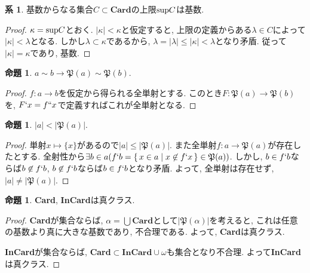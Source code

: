 \documentclass[a4paper, twoside]{bxjsarticle}
\newcommand{\abs}[1]{\left\lvert#1\right\rvert}
\theoremstyle{definition}
\newtheorem{prop}[thm]{命題}
\newtheorem{cor}[thm]{系}
\begin{document}
        \begin{cor}\label{supcardiscard}
            基数からなる集合$C\subset \textbf{Card}$の上限${\rm sup}C$は基数.
        \end{cor}
        \begin{proof}
            $\kappa = {\rm sup}C$とおく. $\abs{\kappa}<\kappa$と仮定すると, 上限の定義からある$\lambda\in C$によって$\abs{\kappa}<\lambda$となる. しかし$\lambda\subset\kappa$であるから, $\lambda=\abs{\lambda}\leq\abs{\kappa}<\lambda$となり矛盾. 従って$\abs{\kappa}=\kappa$であり, 基数.
        \end{proof}
        \begin{prop}
            $a\sim b\to \mathfrak{P}(a)\sim\mathfrak{P}(b)$.
        \end{prop}
        \begin{proof}
            $f\colon a\to b$を仮定から得られる全単射とする. このとき$F\colon \mathfrak{P}(a)\to\mathfrak{P}(b)$を, $F`x=f``x$で定義すればこれが全単射となる.
        \end{proof}
        \begin{prop}
            $\abs{a}<\abs{\mathfrak{P}(a)}$.
        \end{prop}
        \begin{proof}
            単射$x\mapsto\{x\}$があるので$\abs{a}\leq\abs{\mathfrak{P}(a)}$. また全単射$f\colon a\to\mathfrak{P}(a)$が存在したとする. 全射性から$\exists b\in a(f`b=\set{x\in a|x\not\in f`x}\in\mathfrak{P}(a))$. しかし, $b\in f`b$ならば$b\not\in f`b$, $b\not\in f`b$ならば$b\in f`b$となり矛盾. よって, 全単射は存在せず, $\abs{a}\neq\abs{\mathfrak{P}(a)}$.
        \end{proof}
        \begin{prop}
            \textbf{Card}, \textbf{InCard}は真クラス.
        \end{prop}
        \begin{proof}
            \textbf{Card}が集合ならば, $\alpha=\bigcup \textbf{Card}$として$\abs{\mathfrak{P}(\alpha)}$を考えると, これは任意の基数より真に大きな基数であり, 不合理である. よって, \textbf{Card}は真クラス. 
            
            \textbf{InCard}が集合ならば, \textbf{Card}$\subset\textbf{InCard}\cup\omega$も集合となり不合理. よって\textbf{InCard}は真クラス.
        \end{proof}
        
\end{document}
